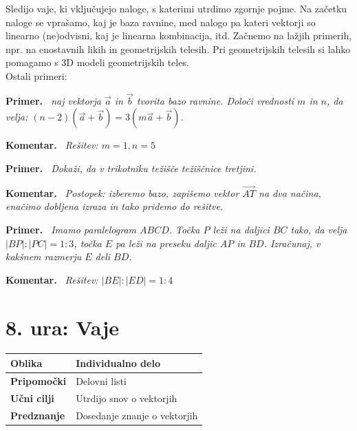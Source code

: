 \documentclass[a4paper,11pt]{article}
\newenvironment{komentar}{%
  \par\medskip\noindent\textbf{Komentar.}\itshape\ }{\par\medskip}
\newenvironment{primer}{%
  \par\medskip\noindent\textbf{Primer.}\itshape\ }{\par\medskip}
\begin{document}
Sledijo vaje, ki vključujejo naloge, s katerimi utrdimo zgornje pojme. Na začetku naloge se vprašamo, kaj je baza ravnine, med nalogo pa kateri vektorji so linearno (ne)odvisni, kaj je linearna kombinacija, itd. Začnemo na lažjih primerih, npr. na enostavnih likih in geometrijskih telesih. Pri geometrijskih telesih si lahko pomagamo s 3D modeli geometrijskih teles.\\
Ostali primeri:
\begin{primer}
    naj vektorja $\vec{a}$ in $\vec{b}$ tvorita bazo ravnine. Določi vrednosti $m$ in $n$, da velja: $(n-2)(\vec{a}+\vec{b})=3(m\vec{a}+\vec{b})$.
\end{primer}
\begin{komentar}
    Rešitev: $m=1, n=5$
\end{komentar}
\begin{primer}
    Dokaži, da v trikotniku težišče težiščnice tretjini.
\end{primer}
\begin{komentar}
    Postopek: izberemo bazo, zapišemo vektor $\vec{AT}$ na dva načina, enačimo dobljena izraza in tako pridemo do rešitve.
\end{komentar}
\begin{primer}
    Imamo paralelogram $ABCD$. Točka $P$ leži na daljici $BC$ tako, da velja $|BP|:|PC|=1:3$, točka $E$ pa leži na preseku daljic $AP$ in $BD$. Izračunaj, v kakšnem razmerju $E$ deli $BD$.
\end{primer}
\begin{komentar}
    Rešitev: $|BE|:|ED|=1:4$
\end{komentar}

\newpage \section{8. ura: Vaje}
\begin{tabularx}{\textwidth}{|>{\bfseries\RaggedRight}p{2.7cm}|X|}
\hline
Oblika &  Individualno delo \\ \hline
Pripomočki & Delovni listi \\ \hline
Učni cilji & Utrdijo snov o vektorjih \\ \hline
Predznanje & Dosedanje znanje o vektorjih \\ \hline

\end{tabularx}
\\
\end{document}
